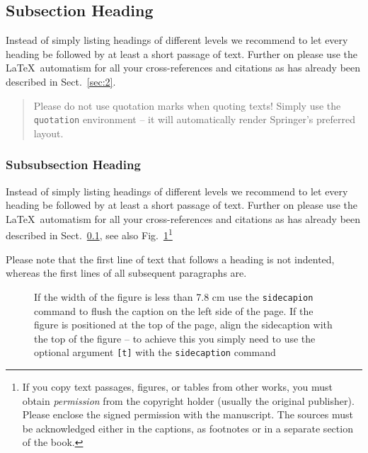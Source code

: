 \documentclass[graybox]{svmult}
\begin{document}
\subsection{Subsection Heading}
\label{subsec:2}
Instead of simply listing headings of different levels we recommend to
let every heading be followed by at least a short passage of text.
Further on please use the \LaTeX\ automatism for all your
cross-references and citations
as has already been described in Sect.~\ref{sec:2}.

\begin{quotation}
Please do not use quotation marks when quoting texts! Simply use the \verb|quotation| environment -- it will automatically render Springer's preferred layout.
\end{quotation}


\subsubsection{Subsubsection Heading}
Instead of simply listing headings of different levels we recommend to
let every heading be followed by at least a short passage of text.
Further on please use the \LaTeX\ automatism for all your
cross-references and citations as has already been described in
Sect.~\ref{subsec:2}, see also Fig.~\ref{fig:1}\footnote{If you copy
text passages, figures, or tables from other works, you must obtain
\textit{permission} from the copyright holder (usually the original
publisher). Please enclose the signed permission with the manuscript. The
sources must be acknowledged either in the
captions, as footnotes or in a separate section of the book.}

Please note that the first line of text that follows a heading is not indented, whereas the first lines of all subsequent paragraphs are.

%
\begin{figure}[b]
\sidecaption
%
%
\caption{If the width of the figure is less than 7.8 cm use the \texttt{sidecapion} command to flush the caption on the left side of the page. If the figure is positioned at the top of the page, align the sidecaption with the top of the figure -- to achieve this you simply need to use the optional argument \texttt{[t]} with the \texttt{sidecaption} command}
\label{fig:1}       %
\end{figure}
\end{document}
